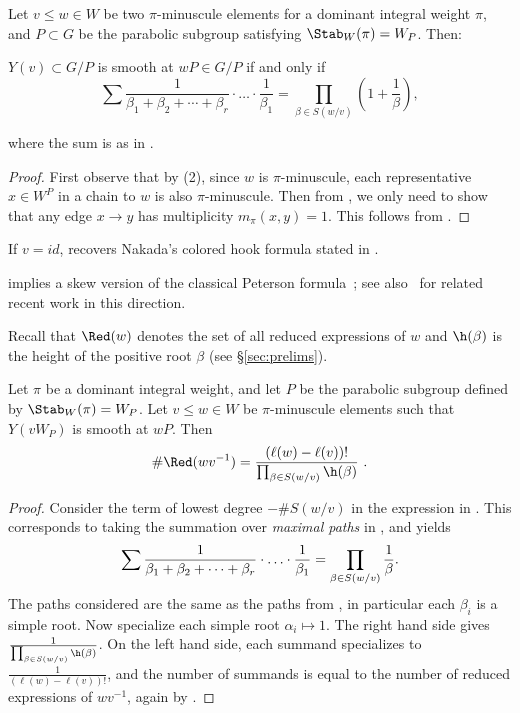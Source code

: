 \begin{corol}\label{col:Nak} 
	Let $v \le w \in W$ be two $\pi$-minuscule elements for a dominant integral weight $\pi$,
	and $P\subset G$ be the parabolic subgroup satisfying 
	$\Stab_W(\pi)=W_P$. Then: 
	\begin{center}
		$Y(v)\subset G/P$ is smooth at $wP\in G/P$  if and only if
		\begin{equation}\label{E:minusculeNak}
			\sum \frac{1}{\beta_1+\beta_2+\cdots +\beta_r} \cdot \ldots \cdot 
			\frac{1}{\beta_1}
			=\prod_{\beta \in S(w/v)}\left(1+\frac{1}{\beta}\right),
		\end{equation}
	\end{center}
	where the sum is as in .
\end{corol}
\begin{proof} First observe that by (2), 
	since $w$ is $\pi$-minuscule, each representative $x \in W^P$ in a chain to $w$ 
	is also $\pi$-minuscule. Then from , we only need to show that 
	any edge $x \to y$ has multiplicity $m_\pi(x,y)=1$. This follows from .
\end{proof}
If $v=id$,  recovers Nakada's colored hook formula stated in . 

 implies 
a skew version of the classical Peterson formula~\cite{carrell:vector,proctor:minuscule};
see also~\cite{kleschchev.ram} for related recent work in this direction.

Recall that $\Red(w)$ 
denotes the set of all reduced expressions of $w$ and $\h(\beta)$ is the height of the positive root $\beta$ (see \S\ref{sec:prelims}).
\begin{corol}\label{cor:skewPP} Let $\pi$ be a 
	dominant integral weight, and let $P$ be the parabolic subgroup defined by
	$\Stab_W(\pi)=W_P$. Let $v \le w\in W$ be $\pi$-minuscule elements 
	such that
	$Y(vW_P)$ is smooth at $wP$. Then
	\begin{equation}\label{equ:petersonproctor}
		\#\Red(wv^{-1})=\frac{(\ell(w)-\ell(v))!}{\prod_{\beta\in S(w/v)}\h(\beta)} ~\/.
	\end{equation}
\end{corol}
\begin{proof} Consider the term of lowest degree $-\# S(w/v)$ in the expression in . This corresponds to taking the summation over {\em maximal paths} in , and yields
	\begin{equation}\label{eq:max_path}
		\sum \frac{1}{\beta_1+\beta_2+\cdots +\beta_r} \cdot \ldots \cdot 
		\frac{1}{\beta_1}
		=\prod_{\beta \in S(w/v)} \frac{1}{\beta} \/.
	\end{equation}
	The paths considered are the same as the paths from , in particular each $\beta_i$ 
	is a simple root. Now specialize each simple root $\alpha_i \mapsto 1$. The right hand side gives $\frac{1}{\prod_{\beta\in S(w/v)}\h(\beta)}$. On the left hand side, each summand specializes to $\frac{1}{ (\ell(w)-\ell(v)) !}$, and the number of summands is equal to the number of reduced expressions of $wv^{-1}$, again by 
	.\end{proof}

